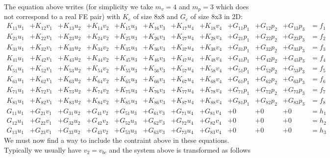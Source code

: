 The equation above writes (for simplicity we take $m_v=4$ and $m_p=3$ which does not correspond to a real FE pair) with $K_e$ of size 8x8 and $G_e$ of size 8x3 in 2D:
{\small
\[
\begin{array}{ccccccccccccc}
K_{11} u_1 &+ K_{12} v_1 &+ K_{13} u_2 &+ K_{14} v_2 &+ K_{15} u_3 &+ K_{16} v_3 &+ K_{17}u_4  &+ K_{18}v_4  
&+ G_{11}p_1 &+ G_{12} p_2 &+ G_{13} p_3 & =  f_1 \\
K_{21} u_1 &+ K_{22} v_1 &+ K_{23} u_2 &+ K_{24} v_2 &+ K_{25} u_3 &+ K_{26} v_3 &+ K_{27}u_4  &+ K_{28}v_4  
&+ G_{21}p_1 &+ G_{22} p_2 &+ G_{23} p_3 & =  f_2 \\
K_{31} u_1 &+ K_{32} v_1 &+ K_{33} u_2 &+ K_{34} v_2 &+ K_{35} u_3 &+ K_{36} v_3 &+ K_{37}u_4  &+ K_{38}v_4  
&+ G_{31}p_1 &+ G_{32} p_2 &+ G_{33} p_3 & =  f_3 \\
K_{41} u_1 &+ K_{42} v_1 &+ K_{43} u_2 &+ K_{44} v_2 &+ K_{45} u_3 &+ K_{46} v_3 &+ K_{47}u_4  &+ K_{48}v_4  
&+ G_{41}p_1 &+ G_{42} p_2 &+ G_{43} p_3 & =  f_4 \\
K_{51} u_1 &+ K_{52} v_1 &+ K_{53} u_2 &+ K_{54} v_2 &+ K_{55} u_3 &+ K_{56} v_3 &+ K_{57}u_4  &+ K_{58}v_4  
&+ G_{51}p_1 &+ G_{52} p_2 &+ G_{53} p_3 & =  f_5 \\
K_{61} u_1 &+ K_{62} v_1 &+ K_{63} u_2 &+ K_{64} v_2 &+ K_{65} u_3 &+ K_{66} v_3 &+ K_{67}u_4  &+ K_{68}v_4  
&+ G_{61}p_1 &+ G_{62} p_2 &+ G_{63} p_3 & =  f_6 \\
K_{71} u_1 &+ K_{72} v_1 &+ K_{73} u_2 &+ K_{74} v_2 &+ K_{75} u_3 &+ K_{76} v_3 &+ K_{77}u_4  &+ K_{78}v_4  
&+ G_{71}p_1 &+ G_{72} p_2 &+ G_{73} p_3 & =  f_7 \\
K_{81} u_1 &+ K_{82} v_1 &+ K_{83} u_2 &+ K_{84} v_2 &+ K_{85} u_3 &+ K_{86} v_3 &+ K_{87}u_4  &+ K_{88}v_4  
&+ G_{81}p_1 &+ G_{82} p_2 &+ G_{83} p_3 & =  f_8 \\
G_{11}u_1 &+ G_{21}v_1 &+ G_{31}u_2 &+ G_{41}v_2 &+ G_{51}u_3 &+ G_{61}v_3 &+ G_{71}u_4 &+ G_{81}v_4 &+0&+0&+0&= h_1 \\
G_{12}u_1 &+ G_{22}v_1 &+ G_{32}u_2 &+ G_{42}v_2 &+ G_{52}u_3 &+ G_{62}v_3 &+ G_{72}u_4 &+ G_{82}v_4 &+0&+0&+0&= h_2 \\
G_{13}u_1 &+ G_{23}v_1 &+ G_{33}u_2 &+ G_{43}v_2 &+ G_{53}u_3 &+ G_{63}v_3 &+ G_{73}u_4 &+ G_{83}v_4 &+0&+0&+0&= h_3
\end{array}
\]
}
We must now find a way to include the contraint above in these equations.
Typically we usually have $v_2=v_{bc}$ and the system above is transformed as follows
